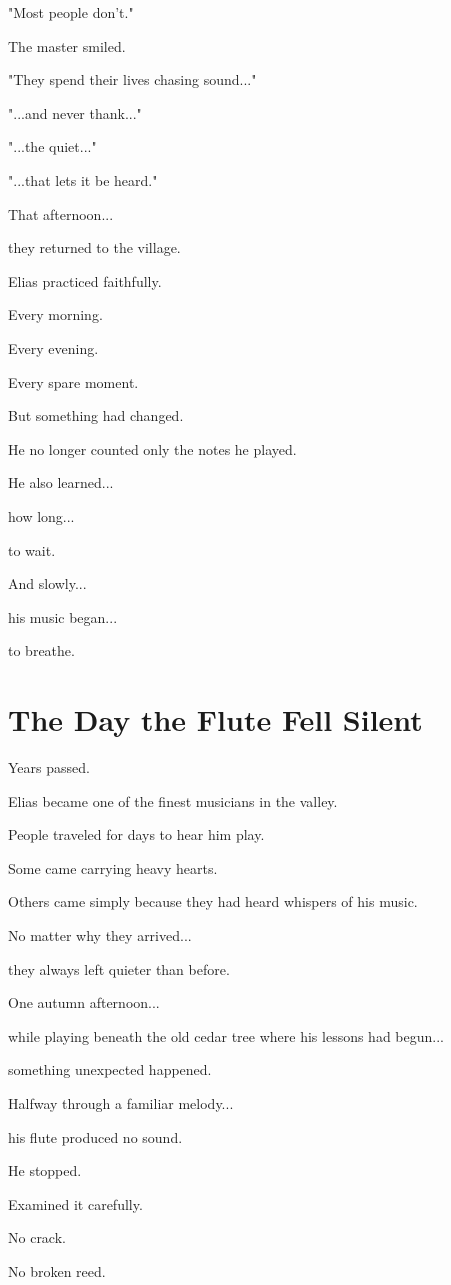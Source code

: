 \documentclass[12pt,openany]{book}
\begin{document}
"Most people don't."

The master smiled.

"They spend their lives chasing sound..."

"...and never thank..."

"...the quiet..."

"...that lets it be heard."

That afternoon...

they returned to the village.

Elias practiced faithfully.

Every morning.

Every evening.

Every spare moment.

But something had changed.

He no longer counted only the notes he played.

He also learned...

how long...

to wait.

And slowly...

his music began...

to breathe.
\section*{The Day the Flute Fell Silent}

Years passed.

Elias became one of the finest musicians in the valley.

People traveled for days to hear him play.

Some came carrying heavy hearts.

Others came simply because they had heard whispers of his music.

No matter why they arrived...

they always left quieter than before.

One autumn afternoon...

while playing beneath the old cedar tree where his lessons had begun...

something unexpected happened.

Halfway through a familiar melody...

his flute produced no sound.

He stopped.

Examined it carefully.

No crack.

No broken reed.
\end{document}
